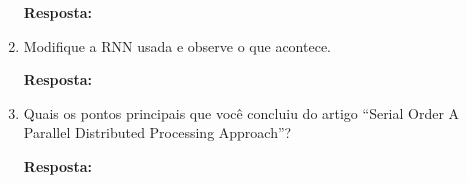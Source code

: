 \documentclass[12 pt]{article}
\begin{document}
\begin{enumerate}
    \textbf{Resposta:} \par

    \item Modifique a RNN usada e observe o que acontece.

    \textbf{Resposta:} \par

    \item Quais os pontos principais que você concluiu do artigo “Serial Order A Parallel Distributed Processing Approach”?
        
    \textbf{Resposta:} \par

\end{enumerate}


\end{document}
